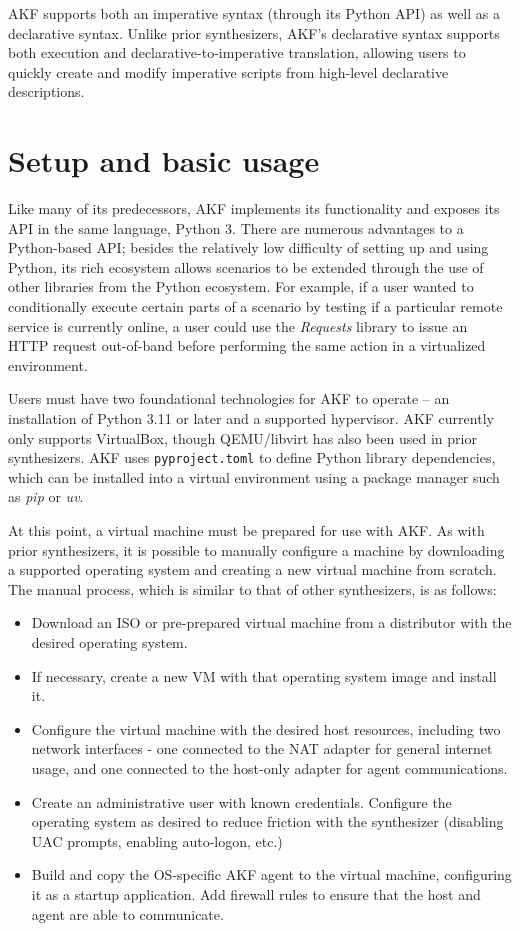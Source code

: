 \documentclass[letterpaper,12pt]{report}
\def\tightlist{}
\newcommand{\passthrough}[1]{#1}
\begin{document}
AKF supports both an imperative syntax (through its Python API) as well
as a declarative syntax. Unlike prior synthesizers, AKF's declarative
syntax supports both execution and declarative-to-imperative
translation, allowing users to quickly create and modify imperative
scripts from high-level declarative descriptions.

\section{Setup and basic usage}\label{setup-and-basic-usage}

Like many of its predecessors, AKF implements its functionality and
exposes its API in the same language, Python 3. There are numerous
advantages to a Python-based API; besides the relatively low difficulty
of setting up and using Python, its rich ecosystem allows scenarios to
be extended through the use of other libraries from the Python
ecosystem. For example, if a user wanted to conditionally execute
certain parts of a scenario by testing if a particular remote service is
currently online, a user could use the \emph{Requests} library
\cite{Requests31Documentation} to issue an HTTP request out-of-band
before performing the same action in a virtualized environment.

Users must have two foundational technologies for AKF to operate -- an
installation of Python 3.11 or later and a supported hypervisor. AKF
currently only supports VirtualBox, though QEMU/libvirt has also been
used in prior synthesizers. AKF uses
\passthrough{\lstinline!pyproject.toml!} to define Python library
dependencies, which can be installed into a virtual environment using a
package manager such as \emph{pip} or \emph{uv}.

At this point, a virtual machine must be prepared for use with AKF. As
with prior synthesizers, it is possible to manually configure a machine
by downloading a supported operating system and creating a new virtual
machine from scratch. The manual process, which is similar to that of
other synthesizers, is as follows:

\begin{itemize}
\tightlist
\item
  Download an ISO or pre-prepared virtual machine from a distributor
  with the desired operating system.
\item
  If necessary, create a new VM with that operating system image and
  install it.
\item
  Configure the virtual machine with the desired host resources,
  including two network interfaces - one connected to the NAT adapter
  for general internet usage, and one connected to the host-only adapter
  for agent communications.
\item
  Create an administrative user with known credentials. Configure the
  operating system as desired to reduce friction with the synthesizer
  (disabling UAC prompts, enabling auto-logon, etc.)
\item
  Build and copy the OS-specific AKF agent to the virtual machine,
  configuring it as a startup application. Add firewall rules to ensure
  that the host and agent are able to communicate.
\end{itemize}
\end{document}
